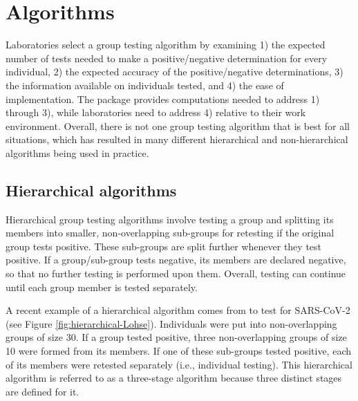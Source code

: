 \section[Algorithms]{Algorithms\label{sec:Algorithms}}

Laboratories select a group testing algorithm by examining 1) the
expected number of tests needed to make a positive/negative determination
for every individual, 2) the expected accuracy of the positive/negative
determinations, 3) the information available on individuals tested,
and 4) the ease of implementation. The  package provides
computations needed to address 1) through 3), while laboratories need
to address 4) relative to their work environment. Overall, there is
not one group testing algorithm that is best for all situations, which
has resulted in many different hierarchical and non-hierarchical algorithms
being used in practice.

\subsection{Hierarchical algorithms}

Hierarchical group testing algorithms involve testing a group and
splitting its members into smaller, non-overlapping sub-groups for
retesting if the original group tests positive. These sub-groups are
split further whenever they test positive. If a group/sub-group tests
negative, its members are declared negative, so that no further testing
is performed upon them. Overall, testing can continue until each group
member is tested separately. 

A recent example of a hierarchical algorithm comes from \citet{lohse2020pooling}
to test for SARS-CoV-2 (see Figure \ref{fig:hierarchical-Lohse}).
Individuals were put into non-overlapping groups of size 30. If a
group tested positive, three non-overlapping groups of size 10 were
formed from its members. If one of these sub-groups tested positive,
each of its members were retested separately (i.e., individual testing).
This hierarchical algorithm is referred to as a three-stage algorithm
because three distinct stages are defined for it.

